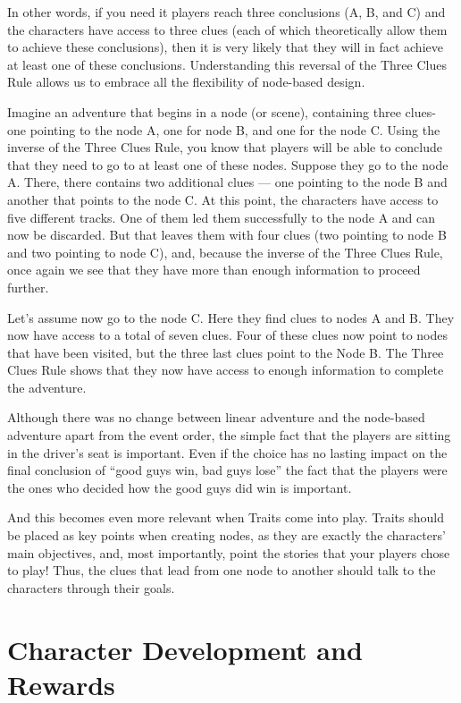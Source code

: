 \begin{multicols}{2}
In other words, if you need it players reach three conclusions (A, B, and C) and the characters have access to three clues (each of which theoretically allow them to achieve these conclusions), then it is very likely that they will in fact achieve at least one of these conclusions. Understanding this reversal of the Three Clues Rule allows us to embrace all the flexibility of node-based design.

Imagine an adventure that begins in a node (or scene), containing three clues- one pointing to the node A, one for node B, and one for the node C. Using the inverse of the Three Clues Rule, you know that players will be able to conclude that they need to go to at least one of these nodes. Suppose they go to the node A. There, there contains two additional clues --- one pointing to the node B and another that points to the node C. At this point, the characters have access to five different tracks. One of them led them successfully to the node A and can now be discarded. But that leaves them with four clues (two pointing to node B and two pointing to node C), and, because the inverse of the Three Clues Rule, once again we see that they have more than enough information to proceed further.

Let's assume now go to the node C. Here they find clues to nodes A and B. They now have access to a total of seven clues. Four of these clues now point to nodes that have been visited, but the three last clues point to the Node B. The Three Clues Rule shows that they now have access to enough information to complete the adventure.

Although there was no change between linear adventure and the node-based adventure apart from the event order, the simple fact that the players are sitting in the driver's seat is important. Even if the choice has no lasting impact on the final conclusion of ``good guys win, bad guys lose'' the fact that the players were the ones who decided how the good guys did win is important.

And this becomes even more relevant when Traits come into play. Traits should be placed as key points when creating nodes, as they are exactly the characters’ main objectives, and, most importantly, point the stories that your players chose to play! Thus, the clues that lead from one node to another should talk to the characters through their goals.
\end{multicols}

\section{Character Development and Rewards}\label{sec:gm-chardev}
